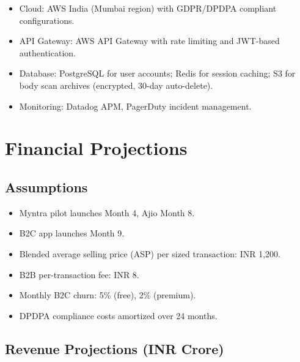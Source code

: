 \documentclass[12pt,a4paper]{article}
\begin{document}
\begin{itemize}
    \item Cloud: AWS India (Mumbai region) with GDPR/DPDPA compliant configurations.
    \item API Gateway: AWS API Gateway with rate limiting and JWT-based authentication.
    \item Database: PostgreSQL for user accounts; Redis for session caching; S3 for body scan archives (encrypted, 30-day auto-delete).
    \item Monitoring: Datadog APM, PagerDuty incident management.
\end{itemize}

\section{Financial Projections}

\subsection{Assumptions}

\begin{itemize}
    \item Myntra pilot launches Month 4, Ajio Month 8.
    \item B2C app launches Month 9.
    \item Blended average selling price (ASP) per sized transaction: INR 1,200.
    \item B2B per-transaction fee: INR 8.
    \item Monthly B2C churn: 5\% (free), 2\% (premium).
    \item DPDPA compliance costs amortized over 24 months.
\end{itemize}

\subsection{Revenue Projections (INR Crore)}
\end{document}
